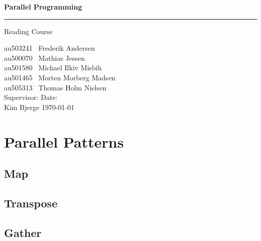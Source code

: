 \documentclass[12px,oz]{report}
\begin{document}
	

\thispagestyle{empty}
	\begin{titlepage}
		\centering
		\vspace*{3\baselineskip}
		{\Huge \bfseries Parallel Programming}
		\rule{\linewidth}{0.5mm}
		\LARGE
		Reading Course
		\\
		\null\vfill
		\begin{flushleft} \large
			au503241 \hspace*{2em} \  Frederik Andersen\\
			au500070 \hspace*{2em} \  Mathias Jessen\\
			au501580 \hspace*{2em} \  Michael Ilkiv Misbih\\
			au501465 \hspace*{2em} \  Morten Morberg Madsen\\
			au505313 \hspace*{2em} \  Thomas Holm Nielsen\\
			\vspace{100pt}
			Supervisor:\hspace{94pt}  Date: \\
			Kim Bjerge \hspace{90pt}  \today\\
		\end{flushleft}
		\vspace*{6\baselineskip}
	\end{titlepage}
	\thispagestyle{empty}
\clearpage
\setcounter{page}{1}

\chapter{Parallel Patterns}
\label{ch-patterns}

	
	\section{Map}
	\label{sec-map}
	
	
	\section{Transpose}
	\label{sec-transpose}
	
	
	\section{Gather}
	\label{sec-gather}
	
	
\end{document}
